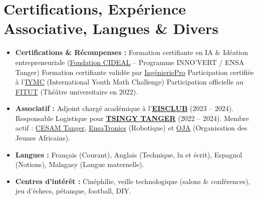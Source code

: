 \documentclass[10pt, a4paper]{article}
\begin{document}
\section*{Certifications, Expérience Associative, Langues \& Divers}
\begin{itemize}[leftmargin=*, itemsep=0.3ex, parsep=0pt]
	\item \textbf{Certifications \& Récompenses :} Formation certifiante en IA \& Idéation entrepreneuriale (\href{http://cidealmaroc.org/}{Fondation CIDEAL} -- \mbox{Programme} INNO'VERT / ENSA Tanger)\textbar{} Formation certifiante validée par \href{https://web.facebook.com/profile.php?id=61567878936369}{IngénieriePro} \textbar{} Participation certifiée à l'\href{https://iymc.info/fr/}{IYMC} (International Youth Math Challenge) \textbar{} Participation officielle au \href{https://www.fitut.ma/}{FITUT} (Théâtre universitaire en 2022).
	\item \textbf{Associatif :} Adjoint chargé académique à l'\href{https://www.linkedin.com/company/eisclubuae/home/}{\textbf{EISCLUB}} (2023 -- 2024). Responsable Logistique pour \href{https://tsingymaroc.org/}{\textbf{TSINGY TANGER}} (2022 -- 2024). Membre actif : \href{https://cesamcentrale.org/category/sections-cesam/tanger/}{CESAM Tanger}, \href{https://www.instagram.com/ensatronics/}{EnsaTronics} (Robotique) et \href{https://www.ojafricains.org/}{OJA} (Organisation des Jeunes Africains).
	\item \textbf{Langues :} Français (Courant), Anglais (Technique, lu et écrit), Espagnol (Notions), Malagasy (Langue maternelle).
	\item \textbf{Centres d'intérêt :} Cinéphilie, veille technologique (salons \& conférences), jeu d'échecs, pétanque, football, DIY.

\end{itemize}
\end{document}
